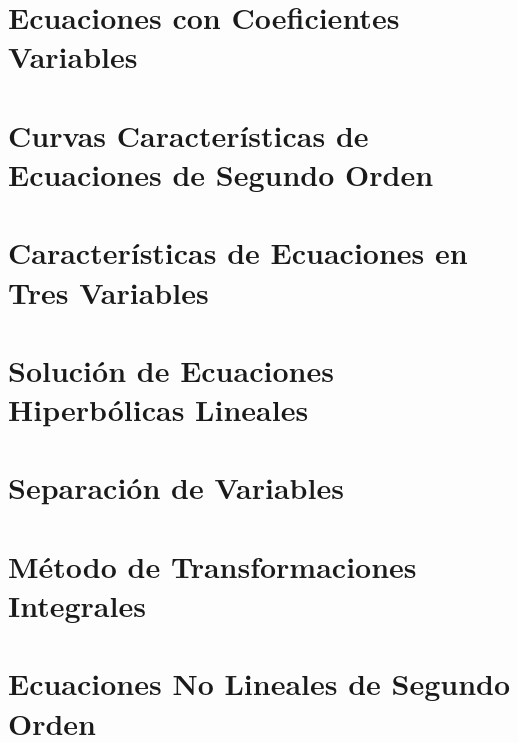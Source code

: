 \section{Ecuaciones con Coeficientes Variables}

\section{Curvas Características de Ecuaciones de Segundo Orden}

\section{Características de Ecuaciones en Tres Variables}

\section{Solución de Ecuaciones Hiperbólicas Lineales}

\section{Separación de Variables}

\section{Método de Transformaciones Integrales}

\section{Ecuaciones No Lineales de Segundo Orden}


























































